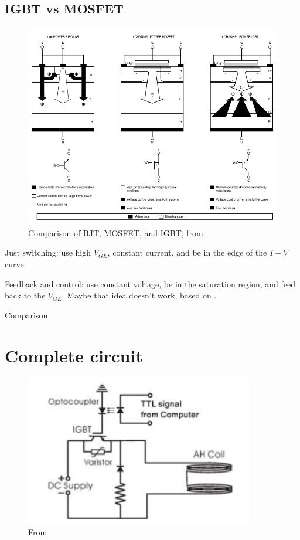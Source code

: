 \documentclass[12pt,a4paper]{article}
\begin{document}
\subsection{IGBT vs MOSFET}

\begin{figure}[ht!]
\centering
\includegraphics[width=150mm]{comparison1.png}
\caption{Comparison of BJT, MOSFET, and IGBT, from \cite{MitsubishiIGBT}.}
\label{fig:comparison1}
\end{figure}

Just switching: use high $V_{GE}$, constant current, and be in the edge of the $I-V$ curve.

Feedback and control: use constant voltage, be in the saturation region, and feed back to the $V_{GE}$. Maybe that idea doesn't work, based on \citep{Bortis2008}.

Comparison \cite{Blake}

\section{Complete circuit}

\begin{figure}[ht!]
\centering
\includegraphics[width=100mm]{Yum2012_circuit.png}
\caption{From \cite{Yum2012}}
\label{fig:yum2012circuit}
\end{figure}
\end{document}
